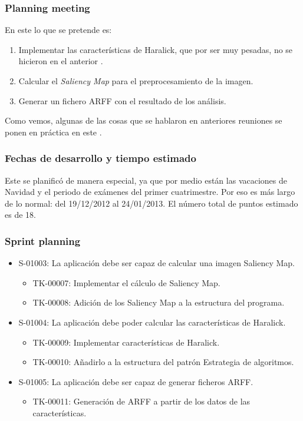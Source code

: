 \subsubsection*{Planning meeting}
En este \sprint{} lo que se pretende es:

\begin{enumerate}
\item Implementar las características de Haralick, que por ser muy pesadas, no se hicieron en el anterior \sprint{}.
\item Calcular el \textit{Saliency Map} para el preprocesamiento de la imagen.
\item Generar un fichero ARFF con el resultado de los análisis.
\end{enumerate}

Como vemos, algunas de las cosas que se hablaron en anteriores reuniones se ponen en práctica en este \sprint{}.

\subsubsection*{Fechas de desarrollo y tiempo estimado}
Este \sprint{} se planificó de manera especial, ya que por medio están las vacaciones de Navidad y el periodo de exámenes del primer cuatrimestre. Por eso es más largo de lo normal: del 19/12/2012 al 24/01/2013. El número total de puntos estimado es de 18.

\subsubsection*{Sprint planning}
\begin{itemize}
 \item S-01003: La aplicación debe ser capaz de calcular una imagen Saliency Map.
 \begin{itemize}
  \item TK-00007: Implementar el cálculo de Saliency Map.
  \item TK-00008: Adición de los Saliency Map a la estructura del programa.
 \end{itemize} 
 \item S-01004: La aplicación debe poder calcular las características de Haralick.
 \begin{itemize}
  \item TK-00009: Implementar características de Haralick.
  \item TK-00010: Añadirlo a la estructura del patrón Estrategia de algoritmos.
 \end{itemize}
 \item S-01005: La aplicación debe ser capaz de generar ficheros ARFF.
 \begin{itemize}
  \item TK-00011: Generación de ARFF a partir de los datos de las características.
 \end{itemize}
\end{itemize}

